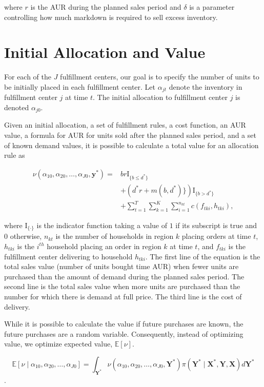 \documentclass[11pt, oneside]{article}   	%
\begin{document}
\noindent where $r$ is the AUR during the planned sales period and $\delta$ is a parameter controlling how much markdown is required to sell excess inventory.

\section{Initial Allocation and Value}

For each of the $J$ fulfillment centers, our goal is to specify the number of units to be initially placed in each fulfillment center.  Let $\alpha_{jt}$ denote the inventory in fulfillment center $j$ at time $t$.  The initial allocation to fulfillment center $j$ is denoted $\alpha_{j0}$.

Given an initial allocation, a set of fulfillment rules, a cost function, an AUR value, a formula for AUR for units sold after the planned sales period, and a set of known demand values, it is possible to calculate a total value for an allocation rule as

\begin{align*}
\nu(\alpha_{10}, \alpha_{20}, \ldots, \alpha_{J0}, \mathbf{y}^*) = &br \mathrm{I}_{\{b \leq d^*\}} \\
&+ \left( d^*r + m(b, d^*) \} \right) \mathrm{I}_{ \{ b > d^* \} } \\
&+ \sum_{t = 1}^T \sum_{k = 1}^K \sum_{i = 1}^{n_{kt}} c (f_{tki}, h_{tki}),
\end{align*}

\noindent where $\mathrm{I}_{\{ \cdot \}}$ is the indicator function taking a value of $1$ if its subscript is true and $0$ otherwise, $n_{kt}$ is the number of households in region $k$ placing orders at time $t$, $h_{tki}$ is the $i^{th}$ household placing an order in region $k$ at time $t$, and $f_{tki}$ is the fulfillment center delivering to household $h_{tki}$.  The first line of the equation is the total sales value (number of units bought time AUR) when fewer units are purchased than the amount of demand during the planned sales period.  The second line is the total sales value when more units are purchased than the number for which there is demand at full price.  The third line is the cost of delivery.

While it is possible to calculate the value if future purchases are known, the future purchases are a random variable.  Consequently, instead of optimizing value, we optimize expected value, $\mathbb{E}[\nu]$.

$$\mathbb{E}[\nu \mid \alpha_{10}, \alpha_{20}, \ldots, \alpha_{J0}] = \int_{\mathbf{Y}^*} \nu(\alpha_{10}, \alpha_{20}, \ldots, \alpha_{J0}, \mathbf{Y}^*) \pi (\mathbf{Y}^* \mid \mathbf{X}^*, \mathbf{Y}, \mathbf{X}) d \mathbf{Y}^*$$.
\end{document}

